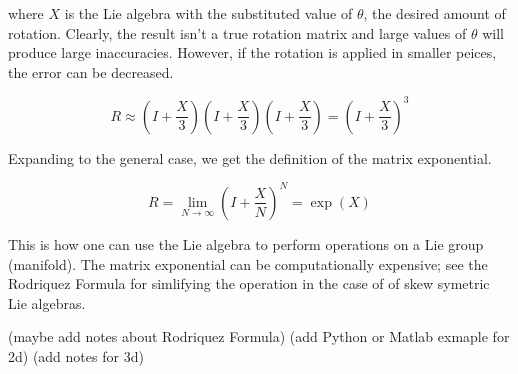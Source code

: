 \documentclass{article}
\begin{document}
  where $X$ is the Lie algebra with the substituted value of $\theta$, the desired amount of rotation. Clearly, the result isn't a true rotation matrix and large values of $\theta$ will produce large inaccuracies. However, if the rotation is applied in smaller peices, the error can be decreased.

  \begin{equation}
    R \approx \left( I + \frac{X}{3} \right) \left( I + \frac{X}{3} \right) \left( I + \frac{X}{3} \right) = \left( I + \frac{X}{3} \right)^3
  \end{equation}

  Expanding to the general case, we get the definition of the matrix exponential.

  \begin{equation}
    R = \lim_{N\to\infty} \left( I + \frac{X}{N} \right)^N = \exp(X)
  \end{equation}

  This is how one can use the Lie algebra to perform operations on a Lie group (manifold). The matrix exponential can be computationally expensive; see the Rodriquez Formula for simlifying the operation in the case of of skew symetric Lie algebras.

  (maybe add notes about Rodriquez Formula)
  (add Python or Matlab exmaple for 2d)
  (add notes for 3d)


\end{document}
